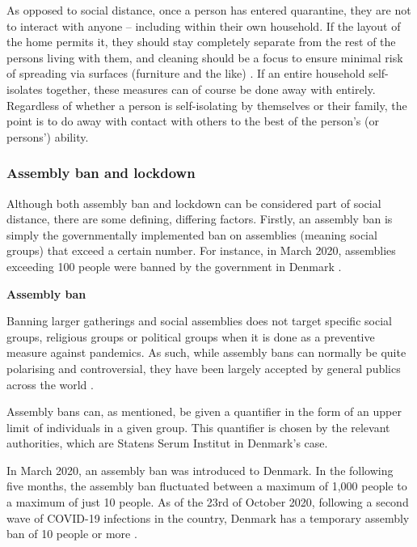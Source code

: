 As opposed to social distance, once a person has entered quarantine, they are not to interact with anyone – including within their own household. If the layout of the home permits it, they should stay completely separate from the rest of the persons living with them, and cleaning should be a focus to ensure minimal risk of spreading via surfaces (furniture and the like) \citep{ayenigbara_covid-19_2020}. If an entire household self-isolates together, these measures can of course be done away with entirely. Regardless of whether a person is self-isolating by themselves or their family, the point is to do away with contact with others to the best of the person's (or persons') ability.




\subsubsection{Assembly ban and lockdown}

Although both assembly ban and lockdown can be considered part of social distance, there are some defining, differing factors. Firstly, an assembly ban is simply the governmentally implemented ban on assemblies (meaning social groups) that exceed a certain number. For instance, in March 2020, assemblies exceeding 100 people were banned by the government in Denmark \citep{ronnstad_tidslinje_2020}. 




\textbf{Assembly ban}

Banning larger gatherings and social assemblies does not target specific social groups, religious groups or political groups when it is done as a preventive measure against pandemics. As such, while assembly bans can normally be quite polarising and controversial, they have been largely accepted by general publics across the world \citep{gostin_governmental_2020}. 

Assembly bans can, as mentioned, be given a quantifier in the form of an upper limit of individuals in a given group. This quantifier is chosen by the relevant authorities, which are Statens Serum Institut in Denmark's case. 

In March 2020, an assembly ban was introduced to Denmark. In the following five months, the assembly ban fluctuated between a maximum of 1,000 people to a maximum of just 10 people. As of the 23rd of October 2020, following a second wave of COVID-19 infections in the country, Denmark has a temporary assembly ban of 10 people or more \citep{ronnstad_tidslinje_2020}.




